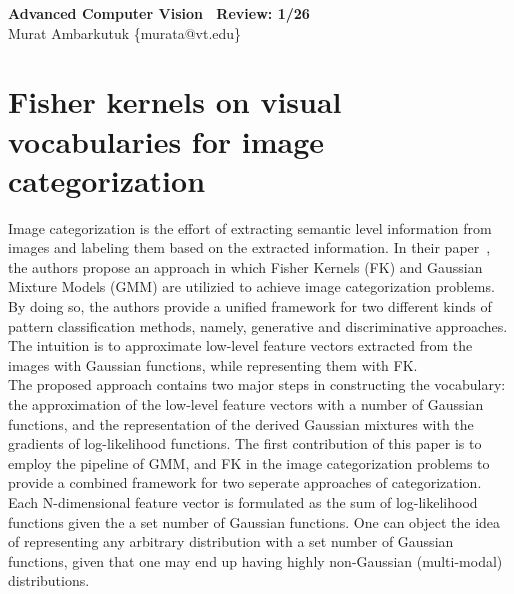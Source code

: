 \documentclass[11pt]{article}
\begin{document}
\thispagestyle{empty}
\begin{center}
	\textbf{\huge{Advanced Computer Vision \textemdash~Review: 1/26}} \\
	\bigskip
	\large{Murat Ambarkutuk \{murata@vt.edu\}}
\end{center}
\section{Fisher kernels on visual vocabularies for image categorization}
Image categorization is the effort of extracting semantic level information from images and labeling them based on the extracted information.
In their paper~\cite{perronnin2007fisher}, the authors propose an approach in which Fisher Kernels (FK) and Gaussian Mixture Models (GMM) are utilizied to achieve image categorization problems.
By doing so, the authors provide a unified framework for two different kinds of pattern classification methods, namely, generative and discriminative approaches.
The intuition is to approximate low-level feature vectors extracted from the images with Gaussian functions, while representing them with FK.\@ \\
\indent The proposed approach contains two major steps in constructing the vocabulary: the approximation of the low-level feature vectors with a number of Gaussian functions, and the representation of the derived Gaussian mixtures with the gradients of log-likelihood functions.
The first contribution of this paper is to employ the pipeline of GMM, and FK in the image categorization problems to provide a combined framework for two seperate approaches of categorization.
Each N-dimensional feature vector is formulated as the sum of log-likelihood functions given the a set number of Gaussian functions.
One can object the idea of representing any arbitrary distribution with a set number of Gaussian functions, given that one may end up having highly non-Gaussian (multi-modal) distributions.
\end{document}
